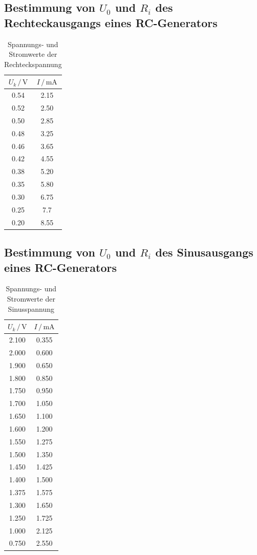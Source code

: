 \subsection{Bestimmung von $U_0$ und $R_i$ des Rechteckausgangs
            eines RC-Generators}
  \begin{table}
    \centering
    \caption{Spannungs- und Stromwerte der Rechteckspannung}
    \label{tab:Rechteck}
    \begin{tabular}{c c}
      \toprule
       $U_k \,/\, \si{\volt}$ & $I \,/\, \si{\milli\ampere}$\\
      \midrule
        0.54 & 2.15\\
        0.52 & 2.50\\
        0.50 & 2.85\\
        0.48 & 3.25\\ 
        0.46 & 3.65\\
        0.42 & 4.55\\
        0.38 & 5.20\\
        0.35 & 5.80\\
        0.30 & 6.75\\
        0.25 & 7.7\\
        0.20 & 8.55\\
      \bottomrule
    \end{tabular}
  \end{table}


\subsection{Bestimmung von $U_0$ und $R_i$ des Sinusausgangs
            eines RC-Generators}
  \begin{table}
    \centering
    \caption{Spannungs- und Stromwerte der Sinusspannung}
    \label{tab:Sinus}
    \begin{tabular}{c c}
      \toprule
       $U_k \,/\, \si{\volt}$ & $I \,/\, \si{\milli\ampere}$\\
      \midrule
        2.100 & 0.355\\
        2.000 & 0.600\\
        1.900 & 0.650\\
        1.800 & 0.850\\
        1.750 & 0.950\\
        1.700 & 1.050\\
        1.650 & 1.100\\
        1.600 & 1.200\\
        1.550 & 1.275\\
        1.500 & 1.350\\
        1.450 & 1.425\\
        1.400 & 1.500\\
        1.375 & 1.575\\
        1.300 & 1.650\\
        1.250 & 1.725\\
        1.000 & 2.125\\
        0.750 & 2.550\\
      \bottomrule
    \end{tabular}
  \end{table}